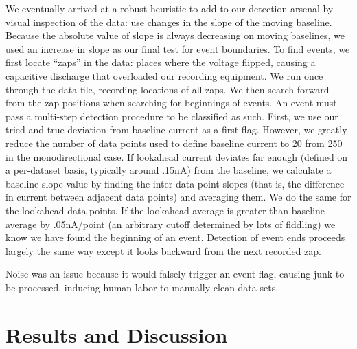 \documentclass[aps,prl,preprint,groupedaddress]{revtex4}
\begin{document}
We eventually arrived at a robust heuristic to add to our detection arsenal by visual inspection of the data: use changes in the slope of the moving baseline.
Because the absolute value of slope is always decreasing on moving baselines, we used an increase in slope as our final test for event boundaries.
To find events, we first locate ``zaps'' in the data: places where the voltage flipped, causing a capacitive discharge that overloaded our recording equipment.
We run once through the data file, recording locations of all zaps.
We then search forward from the zap positions when searching for beginnings of events.
An event must pass a multi-step detection procedure to be classified as such.
First, we use our tried-and-true deviation from baseline current as a first flag.
However, we greatly reduce the number of data points used to define baseline current to 20 from 250 in the monodirectional case.
If lookahead current deviates far enough (defined on a per-dataset basis, typically around .15nA) from the baseline, we calculate a baseline slope value by finding the inter-data-point slopes (that is, the difference in current between adjacent data points) and averaging them.
We do the same for the lookahead data points.
If the lookahead average is greater than baseline average by .05nA/point (an arbitrary cutoff determined by lots of fiddling) we know we have found the beginning of an event.
Detection of event ends proceeds largely the same way except it looks backward from the next recorded zap. 

Noise was an issue because it would falsely trigger an event flag, causing junk to be processed, inducing human labor to manually clean data sets. 

\section{Results and Discussion}
\end{document}
